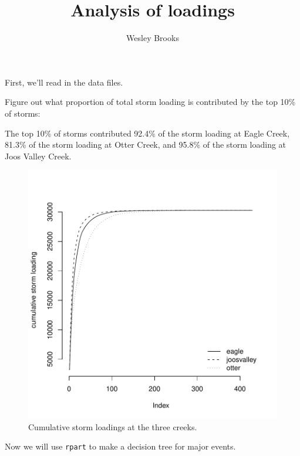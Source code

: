 \documentclass[12pt]{article}
\title{Analysis of loadings}
\author{Wesley Brooks}
\date{}                                           %
\begin{document}
\maketitle

First, we'll read in the data files.


Figure out what proportion of total storm loading is contributed by the top 10\% of storms:


The top 10\% of storms contributed 92.4\% of the storm loading at Eagle Creek, 81.3\% of the storm loading at Otter Creek, and 95.8\% of the storm loading at Joos Valley Creek.


\begin{figure}
  \begin{center}
\includegraphics{loadings-figure1}
  \end{center}
  \caption{Cumulative storm loadings at the three creeks.\label{cdf}}
\end{figure}


Now we will use \verb!rpart! to make a decision tree for major events.
\end{document}
